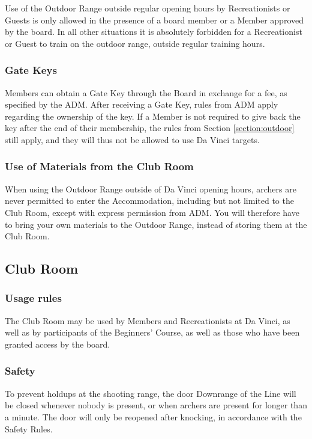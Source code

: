 \documentclass[a4paper]{article}
\newcommand{\Asr}{Safety Rules} %
\begin{document}
Use of the Outdoor Range outside regular opening hours by Recreationists or Guests is only allowed in the presence of a board member or a Member approved by the board. In all other situations it is absolutely forbidden for a Recreationist or Guest to train on the outdoor range, outside regular training hours. 

\subsubsection{Gate Keys}
Members can obtain a Gate Key through the Board in exchange for a fee, as specified by the ADM. After receiving a Gate Key, rules from ADM apply regarding the ownership of the key. If a Member is not required to give back the key after the end of their membership, the rules from Section \ref{section:outdoor} still apply, and they will thus not be allowed to use Da Vinci targets.

\subsubsection{Use of Materials from the Club Room}
When using the Outdoor Range outside of Da Vinci opening hours, archers are never permitted to enter the Accommodation, including but not limited to the Club Room, except with express permission from ADM. You will therefore have to bring your own materials to the Outdoor Range, instead of storing them at the Club Room.

\subsection{Club Room}
\subsubsection{Usage rules}
The Club Room may be used by Members and Recreationists at Da Vinci, as well as by participants of the Beginners' Course, as well as those who have been granted access by the board. 

\subsubsection{Safety}
To prevent holdups at the shooting range, the door Downrange of the Line will be closed whenever nobody is present, or when archers are present for longer than a minute. The door will only be reopened after knocking, in accordance with the \Asr .
\end{document}
